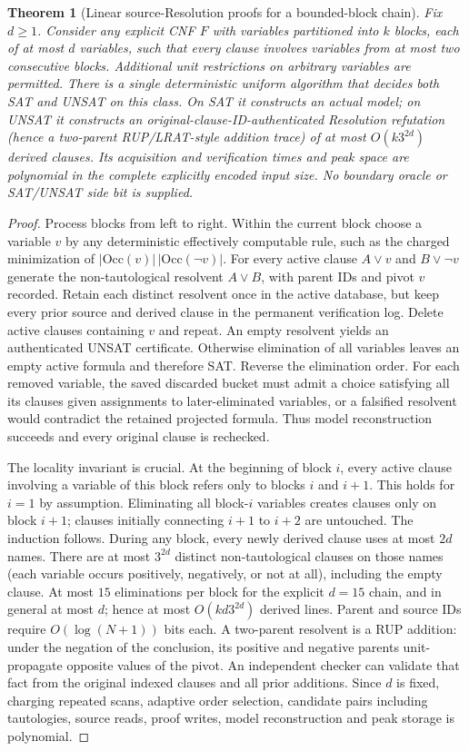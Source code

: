 \documentclass[11pt]{article}
\newtheorem{theorem}{Theorem}
\begin{document}
\begin{theorem}[Linear source-Resolution proofs for a bounded-block chain]\label{thm:main}
Fix $d\ge1$. Consider any explicit CNF $F$ with variables partitioned into $k$ blocks, each of at most $d$ variables, such that every clause involves variables from at most two \emph{consecutive} blocks. Additional unit restrictions on arbitrary variables are permitted. There is a single deterministic uniform algorithm that decides both SAT and UNSAT on this class. On SAT it constructs an actual model; on UNSAT it constructs an original-clause-ID-authenticated Resolution refutation (hence a two-parent RUP/LRAT-style addition trace) of at most $O(k3^{2d})$ derived clauses. Its acquisition and verification times and peak space are polynomial in the complete explicitly encoded input size. No boundary oracle or SAT/UNSAT side bit is supplied.
\end{theorem}
\begin{proof}
Process blocks from left to right. Within the current block choose a variable $v$ by any deterministic effectively computable rule, such as the charged minimization of $|\mathrm{Occ}(v)|\,|\mathrm{Occ}(\neg v)|$. For every active clause $A\lor v$ and $B\lor\neg v$ generate the non-tautological resolvent $A\lor B$, with parent IDs and pivot $v$ recorded. Retain each distinct resolvent once in the active database, but keep every prior source and derived clause in the permanent verification log. Delete active clauses containing $v$ and repeat. An empty resolvent yields an authenticated UNSAT certificate. Otherwise elimination of all variables leaves an empty active formula and therefore SAT. Reverse the elimination order. For each removed variable, the saved discarded bucket must admit a choice satisfying all its clauses given assignments to later-eliminated variables, or a falsified resolvent would contradict the retained projected formula. Thus model reconstruction succeeds and every original clause is rechecked.

The locality invariant is crucial. At the beginning of block $i$, every active clause involving a variable of this block refers only to blocks $i$ and $i+1$. This holds for $i=1$ by assumption. Eliminating all block-$i$ variables creates clauses only on block $i+1$; clauses initially connecting $i+1$ to $i+2$ are untouched. The induction follows. During any block, every newly derived clause uses at most $2d$ names. There are at most $3^{2d}$ distinct non-tautological clauses on those names (each variable occurs positively, negatively, or not at all), including the empty clause. At most $15$ eliminations per block for the explicit $d=15$ chain, and in general at most $d$; hence at most $O(kd3^{2d})$ derived lines. Parent and source IDs require $O(\log(N+1))$ bits each. A two-parent resolvent is a RUP addition: under the negation of the conclusion, its positive and negative parents unit-propagate opposite values of the pivot. An independent checker can validate that fact from the original indexed clauses and all prior additions. Since $d$ is fixed, charging repeated scans, adaptive order selection, candidate pairs including tautologies, source reads, proof writes, model reconstruction and peak storage is polynomial.\qedhere
\end{proof}
\end{document}

